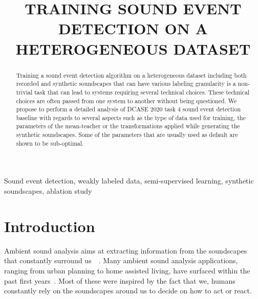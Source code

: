 \documentclass{article}
\title{TRAINING SOUND EVENT DETECTION ON A HETEROGENEOUS DATASET}
\begin{document}
\ninept
\maketitle

\begin{sloppy}

\begin{abstract}
Training a sound event detection algorithm on a heterogeneous dataset including both recorded and synthetic soundscapes that can have various labeling granularity is a non-trivial task that can lead to systems requiring several technical choices. These technical choices are often passed from one system to another without being questioned. We propose to perform a detailed analysis of DCASE 2020 task 4 sound event detection baseline with regards to several aspects such as the type of data used for training, the parameters of the mean-teacher or the transformations applied while generating the synthetic soundscapes. Some of the parameters that are usually used as default are shown to be sub-optimal.
\end{abstract}

\begin{keywords}
Sound event detection, weakly labeled data, semi-supervised learning, synthetic soundscapes, ablation study
\end{keywords}


\section{Introduction}
\label{sec:intro}
Ambient sound analysis aims at extracting information from the soundscapes that constantly surround us~~\cite{virtanen2018computational}. Many ambient sound analysis applications, ranging from urban planning to home assisted living, have surfaced within the past first years~\cite{Bello:SONYC:CACM:18,radhakrishnan2005audio,serizel2016,jin2012event,debes2016monitoring, zigel2009method}. Most of these were inspired by the fact that we, humans constantly rely on the soundscapes around us to decide on how to act or react.


\end{sloppy}
\end{document}

